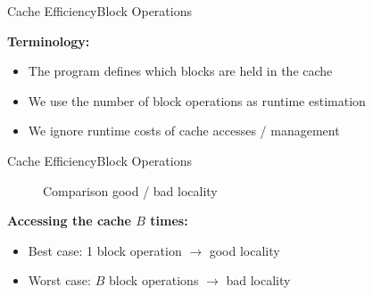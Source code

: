 
\begin{frame}{Cache Efficiency}{Block Operations}
  \vspace{-2.0em}
  \begin{figure}%
    \begin{adjustbox}{width=\linewidth}%
    \end{adjustbox}%
    \label{fig:caching:cache_quanting2}
  \end{figure}%
  \textbf{Terminology:}
  \begin{itemize}
    \item<2->
      The program defines which blocks are held in the
      {\color{MainA}cache}
    \item<3->
      We use the number of {\color{MainA}block operations} as runtime
      estimation
    \item<4->
      We ignore runtime costs of cache accesses / management
  \end{itemize}
\end{frame}


\begin{frame}{Cache Efficiency}{Block Operations}
  \vspace{-2.0em}
  \begin{figure}%
    \begin{adjustbox}{width=\linewidth}%
    \end{adjustbox}%
    \caption{Comparison good / bad locality}
    \label{fig:caching:memory_locality}
  \end{figure}%
  \textbf{Accessing the cache {\color{MainA}$B$} times:}
  \begin{itemize}
    \item
      {\color{MainA}Best case}:
      1 block operation $\rightarrow$ good locality
    \item
      {\color{MainA}Worst case}:
      {\color{MainA}$B$} block operations $\rightarrow$ bad locality
  \end{itemize}
\end{frame}


